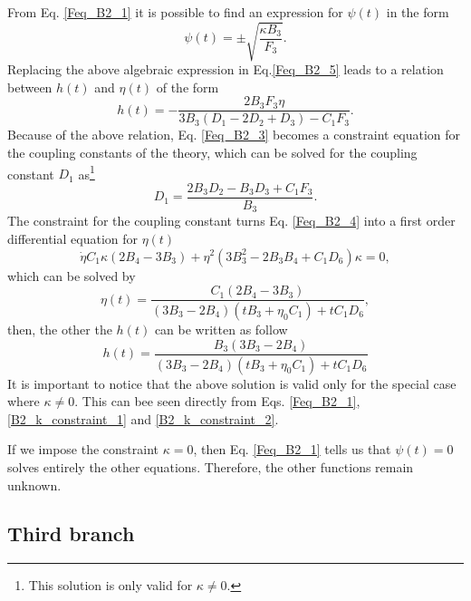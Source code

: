 From Eq. \eqref{Feq_B2_1} it is possible to find an expression for $\psi(t)$ in the form
\begin{equation}
    \psi(t) = \pm \sqrt{\frac{\kappa B_3}{F_3}} .
\end{equation}
Replacing the above algebraic expression in Eq.\eqref{Feq_B2_5} leads to a relation between $h(t)$ and $\eta(t)$ of the form
\begin{equation}
    h(t) = - \frac{2B_3F_3 \eta}{3B_3 \left(D_1 - 2D_2 + D_3\right) - C_1F_3}.
\end{equation}
Because of the above relation, Eq. \eqref{Feq_B2_3} becomes a constraint equation for the coupling constants of the theory,
which can be solved for the coupling constant $D_1$ as\footnote{This solution is only valid for $\kappa \neq 0$.}
\begin{equation}
    \label{B2_k_constraint_1}
	 D_1 = \frac{2B_3D_2 - B_3D_3 + C_1F_3}{B_3}.
\end{equation} 
The constraint for the coupling constant turns Eq. \eqref{Feq_B2_4} into a first order differential equation for $\eta(t)$
\begin{equation}
    \label{B2_k_constraint_2}
    \dot{\eta}C_1 \kappa \left(2B_4 - 3B_3\right) + \eta^2 \left(3B_3^2 - 2B_3 B_4 + C_1D_6\right)\kappa = 0,
\end{equation}
which can be solved by
\begin{equation}
    \eta(t) = \frac{C_1\left(2B_4 - 3B_3\right)}{\left(3B_3 - 2B_4\right)\left(tB_3 + \eta_0 C_1\right) + tC_1D_6},
\end{equation}
then, the other the $h(t)$ can be written as follow
\begin{equation}
    h(t) = \frac{B_3\left(3B_3 - 2B_4\right)}{\left(3B_3 - 2B_4\right)\left(tB_3 + \eta_0 C_1\right) + tC_1D_6} 
\end{equation}
It is important to notice that the above solution is valid only for the special case where $\kappa \neq 0$.
This can bee seen directly from Eqs. \eqref{Feq_B2_1}, \eqref{B2_k_constraint_1} and \eqref{B2_k_constraint_2}. 

If we impose the constraint $\kappa = 0$, then Eq. \eqref{Feq_B2_1} tells us that $\psi(t) = 0$ solves entirely the other
equations. Therefore, the other functions remain unknown.

\subsection{Third branch}

